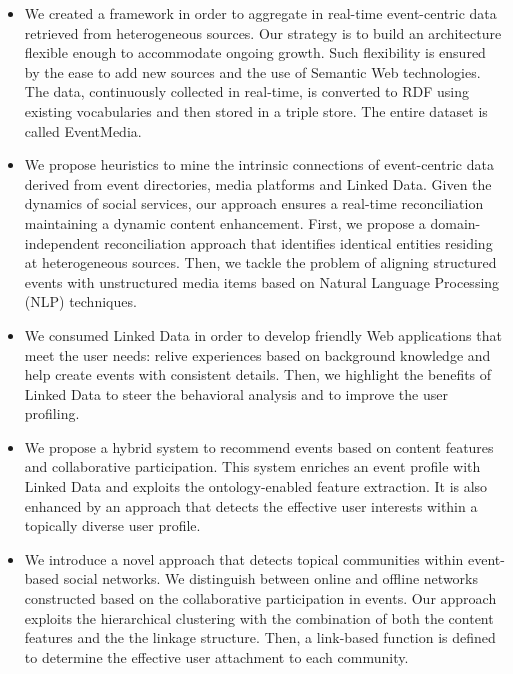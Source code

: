 \begin{itemize}
  \item We created a framework in order to aggregate in real-time event-centric data retrieved from heterogeneous sources. Our strategy is to build an architecture flexible enough to accommodate ongoing growth. Such flexibility is ensured by the ease to add new sources and the use of Semantic Web technologies. The data, continuously collected in real-time, is converted to RDF using existing vocabularies and then stored in a triple store. The entire dataset is called EventMedia.

  \item We propose heuristics to mine the intrinsic connections of event-centric data derived from event directories, media platforms and Linked Data. Given the dynamics of social services, our approach ensures a real-time reconciliation maintaining a dynamic content enhancement. First, we propose a domain-independent reconciliation approach that identifies identical entities residing at heterogeneous sources. Then, we tackle the problem of aligning structured events with unstructured media items based on Natural Language Processing (NLP) techniques.
  
  \item  We consumed Linked Data in order to develop friendly Web applications that meet the user needs: relive experiences based on background knowledge and help create events with consistent details. Then, we highlight the benefits of Linked Data to steer the behavioral analysis and to improve the user profiling.
  
  \item We propose a hybrid system to recommend events based on content features and collaborative participation. This system enriches an event profile with Linked Data and exploits the ontology-enabled feature extraction. It is also enhanced by an approach that detects the effective user interests within a topically diverse user profile. 
      
  \item We introduce a novel approach that detects topical communities within event-based social networks. We distinguish between online and offline networks constructed based on the collaborative participation in events.  Our approach exploits the hierarchical clustering with the combination of both the content features and the the linkage structure. Then, a link-based function is defined to determine the effective user attachment to each community.
    
\end{itemize}

